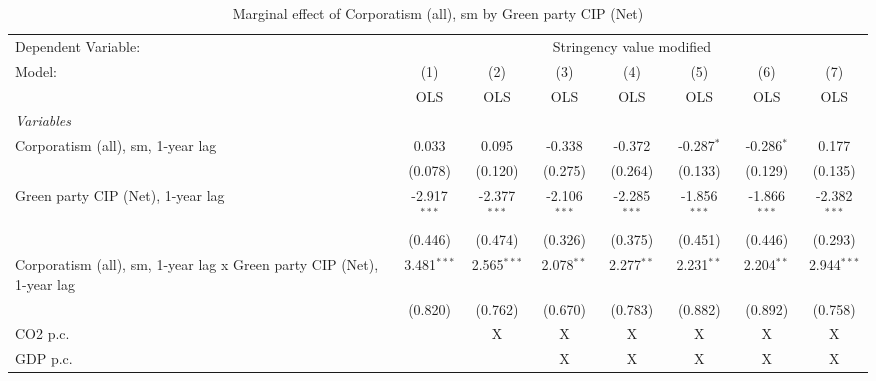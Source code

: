 
\begin{table}[htbp]
   \caption{Marginal effect of Corporatism (all), sm by Green party CIP (Net)}
   \centering
   \begin{tabular}{lccccccc}
      \toprule
      Dependent Variable: & \multicolumn{7}{c}{Stringency value modified}\\
      Model:                                                                & (1)            & (2)            & (3)            & (4)            & (5)            & (6)            & (7)\\  
                                                                            &  OLS           & OLS            & OLS            & OLS            & OLS            & OLS            & OLS\\  
      \midrule
      \emph{Variables}\\
      Corporatism (all), sm, 1-year lag                                     & 0.033          & 0.095          & -0.338         & -0.372         & -0.287$^{*}$   & -0.286$^{*}$   & 0.177\\   
                                                                            & (0.078)        & (0.120)        & (0.275)        & (0.264)        & (0.133)        & (0.129)        & (0.135)\\   
      Green party CIP (Net), 1-year lag                                     & -2.917$^{***}$ & -2.377$^{***}$ & -2.106$^{***}$ & -2.285$^{***}$ & -1.856$^{***}$ & -1.866$^{***}$ & -2.382$^{***}$\\   
                                                                            & (0.446)        & (0.474)        & (0.326)        & (0.375)        & (0.451)        & (0.446)        & (0.293)\\   
      Corporatism (all), sm, 1-year lag x Green party CIP (Net), 1-year lag & 3.481$^{***}$  & 2.565$^{***}$  & 2.078$^{**}$   & 2.277$^{**}$   & 2.231$^{**}$   & 2.204$^{**}$   & 2.944$^{***}$\\   
                                                                            & (0.820)        & (0.762)        & (0.670)        & (0.783)        & (0.882)        & (0.892)        & (0.758)\\   
      CO2 p.c.                                                              &                & X              & X              & X              & X              & X              & X\\  
      GDP p.c.                                                              &                &                & X              & X              & X              & X              & X\\  

\end{tabular}
\end{table}

